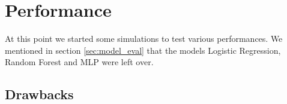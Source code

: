 \section{Performance}
At this point we started some simulations to test various performances. We mentioned in section \ref{sec:model_eval} that the models Logistic Regression, Random Forest and MLP were left over. 

\subsection{Drawbacks}
